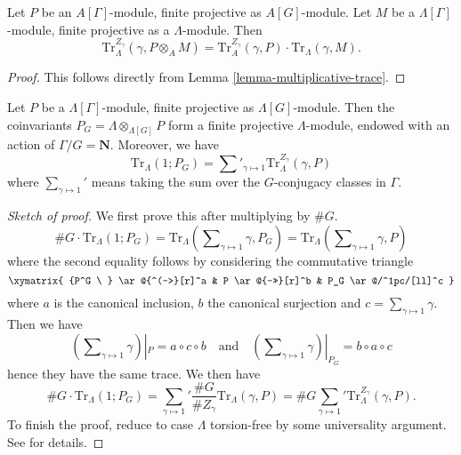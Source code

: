 \begin{lemma}
\label{lemma-weak-trace}
Let $P$ be an $A[\Gamma]$-module, finite projective as $A[G]$-module. Let $M$
be a $\Lambda[\Gamma]$-module, finite projective as a $\Lambda$-module. Then
$$
\text{Tr}_{\Lambda}^{Z_\gamma}(\gamma, P \otimes_A M) =
\text{Tr}_A^{Z_\gamma}(\gamma, P)\cdot \text{Tr}_\Lambda(\gamma, M).
$$
\end{lemma}

\begin{proof}
This follows directly from Lemma \ref{lemma-multiplicative-trace}.
\end{proof}

\begin{lemma}
\label{lemma-trivial-trace}
Let $P$ be a $\Lambda[\Gamma]$-module, finite projective as
$\Lambda[G]$-module. Then the coinvariants
$P_G = \Lambda \otimes_{\Lambda[G]} P$
form a finite projective $\Lambda$-module, endowed with an action of
$\Gamma/G = \mathbf{N}$. Moreover, we have
$$
\text{Tr}_\Lambda(1; P_G) =
\sum\nolimits'_{\gamma \mapsto 1} \text{Tr}_\Lambda^{Z_\gamma}(\gamma, P)
$$
where $\sum_{\gamma\mapsto 1}'$ means taking the sum over the $G$-conjugacy
classes in $\Gamma$.
\end{lemma}

\begin{proof}[Sketch of proof]
We first prove this after multiplying by $\# G$.
$$
\# G\cdot \text{Tr}_\Lambda(1; P_G)
= \text{Tr}_\Lambda(\sum\nolimits_{\gamma\mapsto 1} \gamma, P_G)
= \text{Tr}_\Lambda(\sum\nolimits_{\gamma\mapsto 1} \gamma, P)
$$
where the second equality follows by considering the commutative triangle
$$
\xymatrix{
{P^G \ } \ar@{^(->}[r]^a & P \ar@{->>}[r]^b & P_G \ar@/^1pc/[ll]^c
}
$$
where $a$ is the canonical inclusion, $b$ the canonical surjection and $c =
\sum_{\gamma \mapsto 1} \gamma$. Then we have
$$
(\sum\nolimits_{\gamma \mapsto 1} \gamma) |_P = a \circ c \circ b
\quad\text{and}\quad
(\sum\nolimits_{\gamma \mapsto 1} \gamma) |_{P_G} = b \circ a \circ c
$$
hence they have the same trace. We then have
$$
\# G\cdot \text{Tr}_\Lambda(1; P_G)
=
{\sum_{\gamma\mapsto 1}}'
\frac{\# G}{\# Z_\gamma}\text{Tr}_\Lambda(\gamma, P)
= \# G{\sum_{\gamma\mapsto 1}}' \text{Tr}_\Lambda^{Z_\gamma}(\gamma, P).
$$
To finish the proof, reduce to case $\Lambda$ torsion-free by some universality
argument. See \cite{SGA4.5} for details.
\end{proof}

